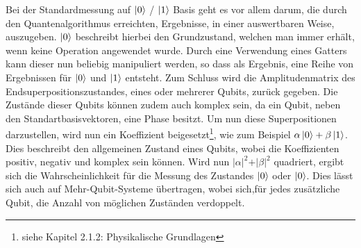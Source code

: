 \documentclass[12pt]{report}
\begin{document}

Bei der Standardmessung auf $\ket{0}$ / $\ket{1}$ Basis geht es vor allem darum, die durch den Quantenalgorithmus erreichten, Ergebnisse, in einer auswertbaren Weise, auszugeben. $\ket{0}$ beschreibt hierbei den Grundzustand, welchen man immer erhält, wenn keine Operation angewendet wurde. Durch eine Verwendung eines Gatters kann dieser nun beliebig manipuliert werden, so dass als Ergebnis, eine Reihe von Ergebnissen für $\ket{0}$ und $\ket{1}$ entsteht. Zum Schluss wird die Amplitudenmatrix des Endsuperpositionszustandes, eines oder mehrerer Qubits, zurück gegeben. Die Zustände dieser Qubits können zudem auch komplex sein, da ein Qubit, neben den Standartbasisvektoren, eine Phase besitzt. Um nun diese Superpositionen darzustellen, wird nun ein Koeffizient beigesetzt\footnote{siehe Kapitel 2.1.2: Physikalische Grundlagen}, wie zum Beispiel $\alpha\ket{0} + \beta\ket{1}$. Dies beschreibt den allgemeinen Zustand eines Qubits, wobei die Koeffizienten positiv, negativ und komplex sein können. Wird nun $\vert \alpha \vert^2 + \vert \beta \vert^2$ quadriert, ergibt sich die Wahrscheinlichkeit für die Messung des Zustandes $\ket{0}$ oder $\ket{0}$. Dies lässt sich auch auf Mehr-Qubit-Systeme übertragen, wobei sich,für jedes zusätzliche Qubit, die Anzahl von möglichen Zuständen verdoppelt.
\end{document}
